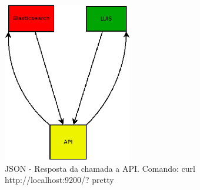 \begin{figure}[!htb]
        \caption{\label{pretty}JSON - Resposta da chamada a API. Comando: curl http://localhost:9200/?   pretty}
        \begin{center}
                \includegraphics[width=0.5\textwidth, height=0.35\textheight]{imagens/teste.eps}
        \end{center}
\end{figure}

